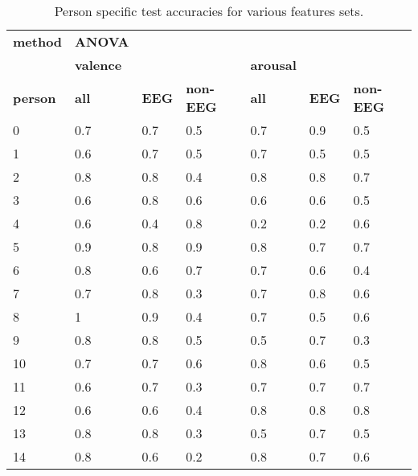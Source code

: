 \begin{table}[]
\centering
\caption{Person specific test accuracies for various features sets.}
\begin{tabular}{l|lll|lll}
\textbf{method}          & \textbf{ANOVA}                &           &         &         &     &         \\
                & \textbf{valence}              &           &         & \textbf{arousal} &     &         \\
\textbf{person}          & \textbf{all}                  & \textbf{EEG}       & \textbf{non-EEG} & \textbf{all}     & \textbf{EEG} & \textbf{non-EEG} \\ \hline 
 0               & 0.7                  & 0.7       & 0.5     & 0.7     & 0.9 & 0.5     \\
1               & 0.6                  & 0.7       & 0.5     & 0.7     & 0.5 & 0.5     \\
2               & 0.8                  & 0.8       & 0.4     & 0.8     & 0.8 & 0.7     \\
3               & 0.6                  & 0.8       & 0.6     & 0.6     & 0.6 & 0.5     \\
4               & 0.6                  & 0.4       & 0.8     & 0.2     & 0.2 & 0.6     \\
5               & 0.9                  & 0.8       & 0.9     & 0.8     & 0.7 & 0.7     \\
6               & 0.8                  & 0.6       & 0.7     & 0.7     & 0.6 & 0.4     \\
7               & 0.7                  & 0.8       & 0.3     & 0.7     & 0.8 & 0.6     \\
8               & 1                    & 0.9       & 0.4     & 0.7     & 0.5 & 0.6     \\
9               & 0.8                  & 0.8       & 0.5     & 0.5     & 0.7 & 0.3     \\
10              & 0.7                  & 0.7       & 0.6     & 0.8     & 0.6 & 0.5     \\
11              & 0.6                  & 0.7       & 0.3     & 0.7     & 0.7 & 0.7     \\
12              & 0.6                  & 0.6       & 0.4     & 0.8     & 0.8 & 0.8     \\
13              & 0.8                  & 0.8       & 0.3     & 0.5     & 0.7 & 0.5     \\
14              & 0.8                  & 0.6       & 0.2     & 0.8     & 0.7 & 0.6     \\

\end{tabular}
\end{table}
